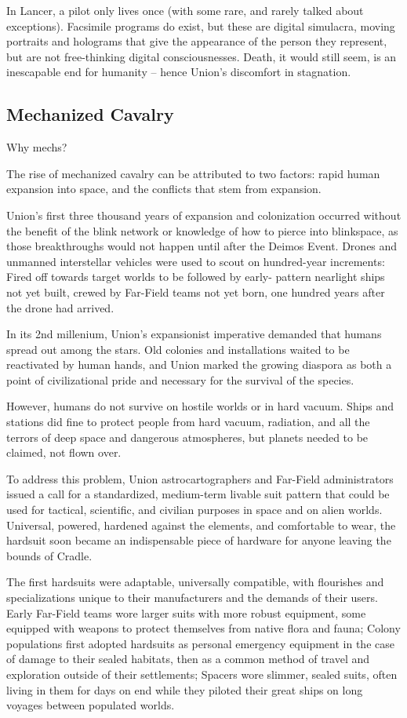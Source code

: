 In Lancer, a pilot only lives once (with some rare, and rarely talked about exceptions). Facsimile
programs do exist, but these are digital simulacra, moving portraits and holograms that give the
appearance of the person they represent, but are not free-thinking digital consciousnesses.
Death, it would still seem, is an inescapable end for humanity -- hence Union's discomfort in
stagnation.

\subsection{Mechanized Cavalry}

Why mechs?

The rise of mechanized cavalry can be attributed to two factors: rapid human expansion into
space, and the conflicts that stem from expansion.

Union's first three thousand years of expansion and colonization occurred without the benefit of
the blink network or knowledge of how to pierce into blinkspace, as those breakthroughs would
not happen until after the Deimos Event. Drones and unmanned interstellar vehicles were used to
scout on hundred-year increments: Fired off towards target worlds to be followed by early-
pattern nearlight ships not yet built, crewed by Far-Field teams not yet born, one hundred years
after the drone had arrived.

In its 2nd millenium, Union's expansionist imperative demanded that humans spread out among
the stars. Old colonies and installations waited to be reactivated by human hands, and Union
marked the growing diaspora as both a point of civilizational pride and necessary for the survival
of the species.

However, humans do not survive on hostile worlds or in hard vacuum. Ships and stations did fine
to protect people from hard vacuum, radiation, and all the terrors of deep space and dangerous
atmospheres, but planets needed to be claimed, not flown over.

To address this problem, Union astrocartographers and Far-Field administrators issued a call for
a standardized, medium-term livable suit pattern that could be used for tactical, scientific, and
civilian purposes in space and on alien worlds. Universal, powered, hardened against the
elements, and comfortable to wear, the hardsuit soon became an indispensable piece of
hardware for anyone leaving the bounds of Cradle.

The first hardsuits were adaptable, universally compatible, with flourishes and specializations
unique to their manufacturers and the demands of their users. Early Far-Field teams wore larger
suits with more robust equipment, some equipped with weapons to protect themselves from
native flora and fauna; Colony populations first adopted hardsuits as personal emergency
equipment in the case of damage to their sealed habitats, then as a common method of travel
and exploration outside of their settlements; Spacers wore slimmer, sealed suits, often living in
them for days on end while they piloted their great ships on long voyages between populated
worlds.

